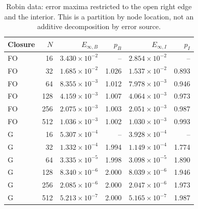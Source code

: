 \begin{table}[htbp]
\centering
\small
\setlength{\tabcolsep}{4pt}
\begin{tabular}{lrrrrr}
\toprule
Closure & $N$ & $E_{\infty,B}$ & $p_B$ & $E_{\infty,I}$ & $p_I$ \\
\midrule
FO & 16 & $3.430\times10^{-2}$ & -- & $2.854\times10^{-2}$ & -- \\
FO & 32 & $1.685\times10^{-2}$ & 1.026 & $1.537\times10^{-2}$ & 0.893 \\
FO & 64 & $8.355\times10^{-3}$ & 1.012 & $7.978\times10^{-3}$ & 0.946 \\
FO & 128 & $4.159\times10^{-3}$ & 1.007 & $4.064\times10^{-3}$ & 0.973 \\
FO & 256 & $2.075\times10^{-3}$ & 1.003 & $2.051\times10^{-3}$ & 0.987 \\
FO & 512 & $1.036\times10^{-3}$ & 1.002 & $1.030\times10^{-3}$ & 0.993 \\
G & 16 & $5.307\times10^{-4}$ & -- & $3.928\times10^{-4}$ & -- \\
G & 32 & $1.332\times10^{-4}$ & 1.994 & $1.149\times10^{-4}$ & 1.774 \\
G & 64 & $3.335\times10^{-5}$ & 1.998 & $3.098\times10^{-5}$ & 1.890 \\
G & 128 & $8.340\times10^{-6}$ & 2.000 & $8.039\times10^{-6}$ & 1.946 \\
G & 256 & $2.085\times10^{-6}$ & 2.000 & $2.047\times10^{-6}$ & 1.973 \\
G & 512 & $5.213\times10^{-7}$ & 2.000 & $5.165\times10^{-7}$ & 1.987 \\
\bottomrule
\end{tabular}
\caption{Robin data: error maxima restricted to the open right edge and the interior. This is a partition by node location, not an additive decomposition by error source.}
\label{tab:spatial-robin}
\end{table}
